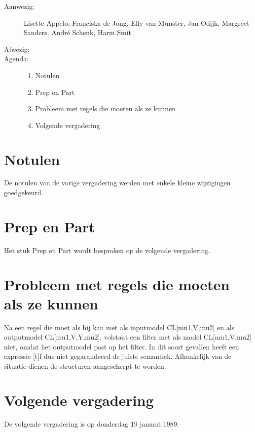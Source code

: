 

   \RosSupersedes{-}
   \MakeRosTitle
%
%
\begin{description}
\item[Aanwezig:] Lisette Appelo, Franciska de Jong, Elly van Munster,
                 Jan Odijk, Margreet Sanders,
                 Andr\'{e} Schenk,  Harm Smit
\item[Afwezig:]


\item[Agenda:]\mbox{}
  \begin{enumerate}
  \item Notulen
  \item Prep en Part
  \item Probleem met regels die moeten als ze kunnen
  \item Volgende vergadering
  \end{enumerate}
\end{description}

\section{Notulen}
De notulen van de vorige vergadering werden met enkele kleine wijzigingen
goedgekeurd. 

\section{Prep en Part}
Het stuk Prep en Part wordt besproken op de volgende vergadering. 

\section{Probleem met regels die moeten als ze kunnen}
Na een regel die moet als hij kan met als inputmodel CL[mu1,V,mu2] en als
outputmodel CL[mu1,V,Y,mu2], volstaat een filter met als model CL[mu1,V,mu2]
niet, omdat het outputmodel past op het filter. In dit soort gevallen heeft een
expressie [t]f dus niet gegarandeerd de juiste semantiek. Afhankelijk van de
situatie dienen de structuren aangescherpt te worden. 

\section{Volgende vergadering}
De volgende vergadering is op donderdag 19 januari 1989.




